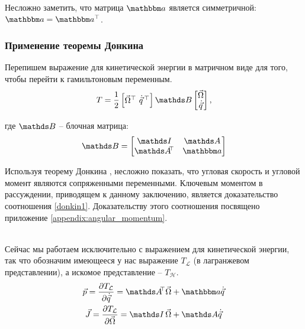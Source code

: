 Несложно заметить, что матрица $\bba$ является симметричной: $\bba = \bba^{\top}$.

\subsubsection{Применение теоремы Донкина}
Перепишем выражение для кинетической энергии в матричном виде для того, чтобы перейти к гамильтоновым переменным.
\begin{gather}
T = \frac{1}{2} 
\begin{bmatrix}
\vec{\Omega}^{\top} \ \dot{\vec{q}}^{\, \top}
\end{bmatrix}
\bbB
\begin{bmatrix}
\vec{\Omega} \\
\dot{\vec{q}}
\end{bmatrix}, \notag
\end{gather}

где $\bbB$ -- блочная матрица:
\begin{gather}
\bbB = 
\begin{bmatrix}
\bbI & \bbA \\
\bbA^{\dn \top} & \bba
\end{bmatrix} \notag
\end{gather}  

\begin{minipage}[c]{0.55\linewidth}
\end{minipage}
\begin{minipage}[c]{0.4\linewidth}
Используя теорему Донкина \cite{gantmaher} , несложно показать, что угловая скорость и угловой момент являются сопряженными переменными. Ключевым моментом в рассуждении, приводящем к данному заключению, является доказательство соотношения \eqref{donkin1}. Доказательству этого соотношения посвящено приложение \eqref{appendix:angular_momentum}.
\end{minipage} \\

Сейчас мы работаем исключительно с выражением для кинетической энергии, так что обозначим имеющееся у нас выражение $T_\mathcal{L}$ (в лагранжевом представлении), а искомое представление -- $T_\mathcal{H}$.
\vverh
\begin{gather}
\vec{p} = \frac{\partial T_\mathcal{L}}{\partial \dot{\vec{q}}} = \bbA^{\dn \top} \vec{\Omega} + \bba \dot{\vec{q}} \notag \\
\vec{J} = \frac{\partial T_\mathcal{L}}{\partial \vec{\Omega}} = \bbI \, \vec{\Omega} + \bbA \dot{\vec{q}} 
\label{donkin1}
\end{gather}

